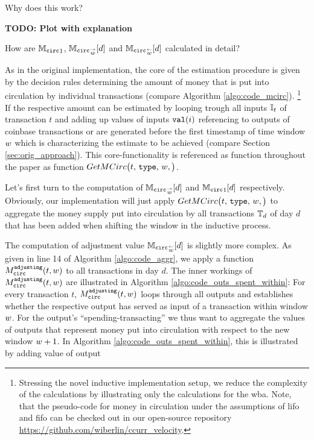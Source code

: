 Why does this work?

\textbf{TODO: Plot with explanation}

How are \({\mathbb{M}_{\mathtt{circ}}}_{1}\), \( {{\mathbb{M}_{\mathtt{circ}}}_{\overset{\rightarrow}{{w}}}}[d] \) and \( {{\mathbb{M}_{\mathtt{circ}}}_{\overset{\leftarrow}{{w}}}}[d] \) calculated in detail? %

As in the original implementation, the core of the estimation procedure is given by the decision rules determining the amount of money that is put into circulation by individual transactions (compare Algorithm \ref{algo:code_mcirc}).%
\footnote{Stressing the novel inductive implementation setup, we reduce the complexity of the calculations by illustrating only the calculations for the \ac{wba}. %
Note, that the pseudo-code for money in circulation under the assumptions of \ac{lifo} and \ac{fifo} can be checked out in our open-source repository \url{https://github.com/wiberlin/ccurr_velocity}.
}
If the respective amount can be estimated by looping trough all inputs \({\mathbb{I}}_{t}\) of transaction \(t\) and adding up values of inputs \({\mathtt{val}}(i)\) referencing to outputs of coinbase transactions or are generated before the first timestamp of time window \({w}\) which is characterizing the estimate to be achieved (compare Section \ref{sec:orig_approach}). %
This core-functionality is referenced as function throughout the paper as function \(GetMCirc\bigl(t,\,{\mathtt{type}},\,{w},\bigr)\). %

Let's first turn to the computation of \({{\mathbb{M}_{\mathtt{circ}}}_{\overset{\rightarrow}{{w}}}}[d]\) and \({\mathbb{M}_{\mathtt{circ}}}_{1}[d]\) respectively. %
Obviously, our implementation will just apply \(GetMCirc\bigl(t,\,{\mathtt{type}},\,{w},\bigr)\) to aggregate the money supply put into circulation by all transactions \({{\mathbb{T}}_{d}}\) of day \(d\) that has been added when shifting the window in the inductive process. %

The computation of adjustment value \({{\mathbb{M}_{\mathtt{circ}}}_{\overset{\leftarrow}{{w}}}}[d]\) is slightly more complex. %
As given in line 14 of Algorithm \ref{algo:code_aggr}, we apply a function \({M_{\mathtt{circ}}^{\mathtt{adjusting}}}(t,w)\) to all transactions in day \(d\). %
The inner workings of \({M_{\mathtt{circ}}^{\mathtt{adjusting}}}(t,w)\) are illustrated in Algorithm \ref{algo:code_outs_spent_within}: %
For every transaction \(t\), \({M_{\mathtt{circ}}^{\mathtt{adjusting}}}(t,w)\) loops through all outputs and establishes whether the respective output has served as input of a transaction within window \({w}\). %
For the output's ``spending-transacting'' we thus want to aggregate the values of outputs that represent money put into circulation with respect to the new window \({w} + 1\). %
In Algorithm \ref{algo:code_outs_spent_within}, this is illustrated by adding value of output 


